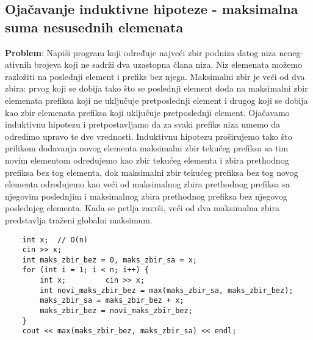 \documentclass{article}
\begin{document}
\subsection{Ojačavanje induktivne hipoteze - maksimalna suma nesusednih elemenata}
\textbf{Problem}: Napiši program koji određuje najveći zbir podniza datog niza neneg-
ativnih brojeva koji ne sadrži dva uzastopna člana niza.
\newline Niz elemenata možemo razložiti na poslednji element i prefiks bez njega. Maksimalni zbir je veći od dva zbira: prvog koji se dobija tako što se poslednji element doda na maksimalni zbir elemenata prefiksa koji ne uključuje
pretposlednji element i drugog koji se dobija kao zbir elemenata prefiksa koji
uključuje pretposlednji element. Ojačavamo induktivnu hipotezu i pretpostavljamo da za svaki prefiks niza
umemo da odredimo upravo te dve vrednosti. Induktivnu
hipotezu proširujemo tako što prilikom dodavanja novog elementa maksimalni zbir tekućeg prefiksa sa tim novim elementom određujemo kao zbir tekućeg elementa i zbira prethodnog prefiksa bez tog elementa, dok maksimalni zbir tekućeg prefiksa bez tog novog elementa određujemo kao veći od maksimalnog zbira
prethodnog prefiksa sa njegovim poslednjim i maksimalnog zbira prethodnog prefiksa bez njegovog poslednjeg elementa. Kada se petlja završi, veći od dva maksimalna zbira predstavlja traženi globalni maksimum.
\begin{lstlisting}
    int x;  // O(n)
    cin >> x;
    int maks_zbir_bez = 0, maks_zbir_sa = x;
    for (int i = 1; i < n; i++) {
        int x;         cin >> x;
        int novi_maks_zbir_bez = max(maks_zbir_sa, maks_zbir_bez);
        maks_zbir_sa = maks_zbir_bez + x;
        maks_zbir_bez = novi_maks_zbir_bez;
    }
    cout << max(maks_zbir_bez, maks_zbir_sa) << endl;
\end{lstlisting}
\end{document}
